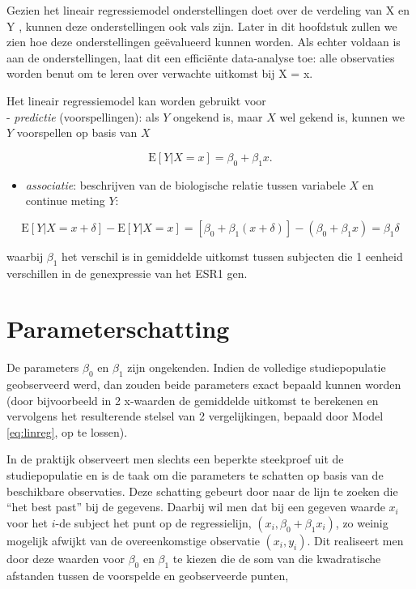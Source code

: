 \documentclass[
  12pt,dutch,coursenotes]{book}
\providecommand{\tightlist}{%
  \setlength{\itemsep}{0pt}\setlength{\parskip}{0pt}}
\begin{document}
Gezien het lineair regressiemodel onderstellingen doet over de verdeling van X en Y , kunnen deze onderstellingen ook vals zijn. Later in dit hoofdstuk zullen we zien hoe deze onderstellingen geëvalueerd kunnen worden. Als echter voldaan is aan de onderstellingen, laat dit een efficiënte data-analyse toe: alle observaties worden benut om te leren over verwachte uitkomst bij X = x.

Het lineair regressiemodel kan worden gebruikt voor\\
- \emph{predictie} (voorspellingen): als \(Y\) ongekend is, maar \(X\) wel gekend is, kunnen we \(Y\) voorspellen op basis van \(X\)

\[\text{E}\left[Y|X =x\right]=\beta_0 + \beta_1 x.\]

\begin{itemize}
\tightlist
\item
  \emph{associatie}: beschrijven van de biologische relatie tussen variabele \(X\) en continue meting \(Y\):
\end{itemize}

\[\text{E}\left[Y|X=x+\delta\right]-\text{E}\left[Y|X=x\right]= \left[\beta_0+\beta_1(x+\delta)\right]-(\beta_0+\beta_1x)=\beta_1\delta\]

waarbij \(\beta_1\) het verschil is in gemiddelde uitkomst tussen subjecten die 1 eenheid verschillen in de genexpressie van het ESR1 gen.

\hypertarget{parameterschatting}{%
\section{Parameterschatting}\label{parameterschatting}}

De parameters \(\beta_0\) en \(\beta_1\) zijn ongekenden. Indien de volledige
studiepopulatie geobserveerd werd, dan zouden beide parameters exact
bepaald kunnen worden (door bijvoorbeeld in 2 x-waarden de gemiddelde uitkomst te berekenen en vervolgens het resulterende stelsel van 2 vergelijkingen, bepaald door Model \eqref{eq:linreg}, op te lossen).

In de praktijk observeert men slechts een beperkte steekproef uit de studiepopulatie en is de taak om die parameters te schatten op basis van de beschikbare observaties.
Deze schatting gebeurt door naar de lijn te zoeken die ``het
best past'' bij de gegevens. Daarbij wil men dat bij een gegeven waarde \(x_i\) voor het \(i\)-de subject het punt op de regressielijn, \((x_i, \beta_0 + \beta_1 x_i)\), zo weinig mogelijk afwijkt van de overeenkomstige observatie \((x_i, y_i)\). Dit realiseert men door deze waarden voor \(\beta_0\) en \(\beta_1\) te
kiezen die de som van die kwadratische afstanden tussen de voorspelde en
geobserveerde punten,
\end{document}
